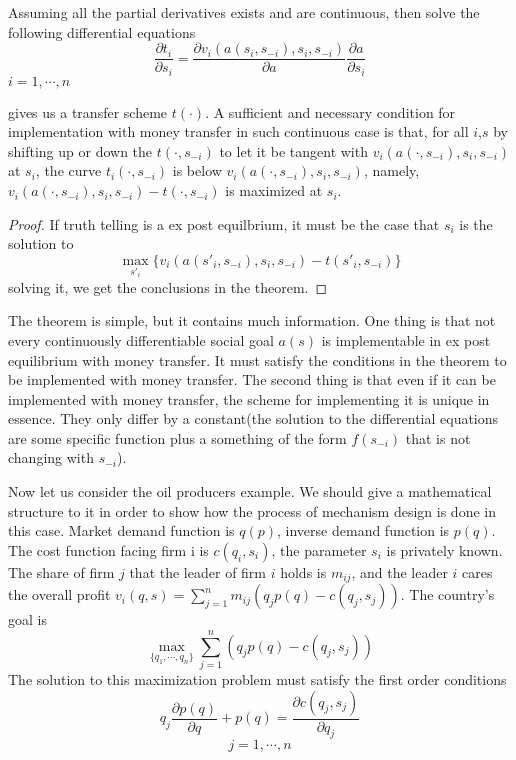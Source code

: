 \begin{thm}
Assuming all the partial derivatives exists and are continuous, then solve the following 
differential equations
 $$\frac{\partial t_i}{\partial s_i} = \frac{\partial v_i(a(s_i,s_{-i}),s_i,s_{-i})}{\partial a } \frac{\partial a}{\partial s_i}$$
 $i=1,\cdots,n$ 
 
 gives us a transfer scheme $t(\cdot)$.
A sufficient and necessary condition for implementation with money transfer in such continuous case is that, for all $i$,$s$
by shifting up or down the $t(\cdot,s_{-i})$ to let it be tangent with $ v_i(a(\cdot,s_{-i}),s_i,s_{-i})$ at $s_i$, the curve
$t_i(\cdot,s_{-i})$ is below $ v_i(a(\cdot,s_{-i}),s_i,s_{-i})$, namely, $v_i(a(\cdot,s_{-i}),s_i,s_{-i})-t(\cdot,s_{-i})$ is
maximized at $s_i$.

 
\end{thm}
\begin{proof}
 If truth telling is a ex post equilbrium, it must be the case that $s_i$ is the solution to
 $$\max_{s'_i} \{v_i(a(s'_i,s_{-i}),s_i,s_{-i})-t(s'_i,s_{-i})\}$$
 solving it, we get the conclusions in the theorem.
\end{proof}

The theorem is simple, but it contains much information. One thing is that not every continuously differentiable
social goal $a(s)$ is implementable in ex post equilibrium with money transfer. It must satisfy the conditions in the theorem 
to be implemented with money transfer. The second thing is that even if it can be implemented with money transfer, the scheme for 
implementing it is unique in essence. They only differ by a constant(the solution to the differential equations are some specific
function plus a something of the form $f(s_{-i})$ that is not changing with $s_{-i}$).

Now let us consider the oil producers example. We should give a mathematical structure to it in order to show how the process of mechanism
design is done in this case. Market demand function is $q(p)$, inverse demand function is $p(q)$. The cost function 
facing firm i is $c(q_i,s_i)$, the parameter $s_i$ is privately known. The share of firm $j$
that the leader of firm  $i$ holds is $m_{ij}$, and  the leader $i$ cares the overall profit 
$v_i(q,s)=\sum_{j=1}^{n} m_{ij}(q_jp(q)-c(q_j,s_j))$. The country's goal is 
$$\max_{\{q_1,\cdots,q_n\}}\sum_{j=1}^{n} (q_jp(q)-c(q_j,s_j)) $$
The solution to this maximization problem must satisfy the first order conditions
$$q_j \frac {\partial p(q)}{\partial q}+p(q)=\frac {\partial c(q_j,s_j)}{\partial q_j}$$
$$j=1,\cdots,n$$

